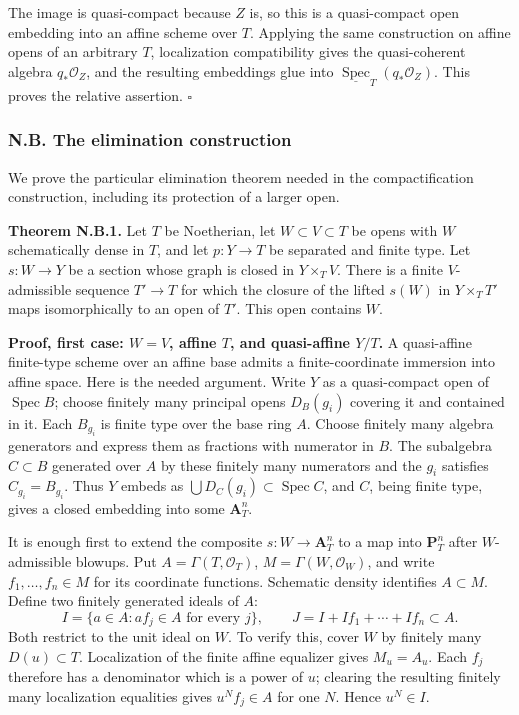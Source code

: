 \documentclass[11pt]{article}
\begin{document}
The image is quasi-compact because \(Z\) is, so this is a quasi-compact
open embedding into an affine scheme over \(T\). Applying the same
construction on affine opens of an arbitrary \(T\), localization
compatibility gives the quasi-coherent algebra \(q_*\mathcal O_Z\), and
the resulting embeddings glue into
\(\underline{\operatorname{Spec}}_T(q_*\mathcal O_Z)\). This proves the
relative assertion. \(\square\)

\subsubsection{N.B. The elimination
construction}\label{n.b.-the-elimination-construction}

We prove the particular elimination theorem needed in the
compactification construction, including its protection of a larger
open.

\textbf{Theorem N.B.1.} Let \(T\) be Noetherian, let
\(W\subset V\subset T\) be opens with \(W\) schematically dense in
\(T\), and let \(p:Y\to T\) be separated and finite type. Let
\(s:W\to Y\) be a section whose graph is closed in \(Y\times_T V\).
There is a finite \(V\)-admissible sequence \(T'\to T\) for which the
closure of the lifted \(s(W)\) in \(Y\times_T T'\) maps isomorphically
to an open of \(T'\). This open contains \(W\).

\textbf{Proof, first case: \(W=V\), affine \(T\), and quasi-affine
\(Y/T\).} A quasi-affine finite-type scheme over an affine base admits a
finite-coordinate immersion into affine space. Here is the needed
argument. Write \(Y\) as a quasi-compact open of
\(\operatorname{Spec}B\); choose finitely many principal opens
\(D_B(g_i)\) covering it and contained in it. Each \(B_{g_i}\) is finite
type over the base ring \(A\). Choose finitely many algebra generators
and express them as fractions with numerator in \(B\). The subalgebra
\(C\subset B\) generated over \(A\) by these finitely many numerators
and the \(g_i\) satisfies \(C_{g_i}=B_{g_i}\). Thus \(Y\) embeds as
\(\bigcup D_C(g_i)\subset\operatorname{Spec}C\), and \(C\), being finite
type, gives a closed embedding into some \(\mathbf A^n_T\).

It is enough first to extend the composite \(s:W\to\mathbf A^n_T\) to a
map into \(\mathbf P^n_T\) after \(W\)-admissible blowups. Put
\(A=\Gamma(T,\mathcal O_T)\), \(M=\Gamma(W,\mathcal O_W)\), and write
\(f_1,\ldots,f_n\in M\) for its coordinate functions. Schematic density
identifies \(A\subset M\). Define two finitely generated ideals of
\(A\): \[
I=\{a\in A:af_j\in A\text{ for every }j\},\qquad
J=I+If_1+\cdots+If_n\subset A.
\tag{N.B.1}
\] Both restrict to the unit ideal on \(W\). To verify this, cover \(W\)
by finitely many \(D(u)\subset T\). Localization of the finite affine
equalizer gives \(M_u=A_u\). Each \(f_j\) therefore has a denominator
which is a power of \(u\); clearing the resulting finitely many
localization equalities gives \(u^Nf_j\in A\) for one \(N\). Hence
\(u^N\in I\).
\end{document}
